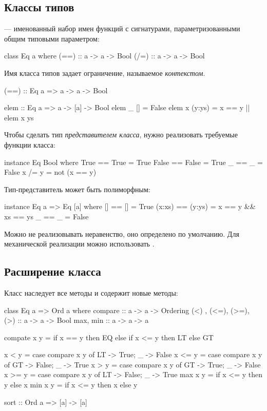 \documentclass[11pt,a4paper]{article}
\begin{document}
\subsection{Классы типов}
 --- именованный набор имен функций с сигнатурами, параметризованными общим типовыми параметром:
\begin{hscode}
class Eq a where
  (==) :: a -> a -> Bool
  (/=) :: a -> a -> Bool
\end{hscode}
Имя класса типов задает ограничение, называемое \textit{контекстом}.
\begin{hscode}
(==) :: Eq a => a -> a -> Bool

elem :: Eq a => a -> [a] -> Bool
elem _ [] = False
elem x (y:ys) = x == y || elem x ys
\end{hscode}
Чтобы сделать тип \textit{представителем класса}, нужно реализовать требуемые функции класса:
\begin{hscode}
instance Eq Bool where
  True  == True  = True
  False == False = True
  _     == _     = False
  x /= y = not (x == y)
\end{hscode}
Тип-представитель может быть полиморфным:
\begin{hscode}
instance Eq a => Eq [a] where
  [] == [] = True
  (x:xs) == (y:ys) = x == y && xs == ys
  _     == _     = False
\end{hscode}
Можно не реализовывать неравенство, оно определено по умолчанию.
Для механической реализации можно использовать .

\subsection{Расширение класса}
Класс  наследует все методы  и содержит новые методы:
\begin{hscode}
class Eq a => Ord a where
  compare :: a -> a -> Ordering
  (<) , (<=), (>=), (>) :: a -> a -> Bool
  max, min :: a -> a -> a

  compate x y = if x == y then EQ 
                else if x <= y then LT
                else GT

  x < y = case compare x y of {LT -> True; _ -> False}
  x <= y = case compare x y of {GT -> False; _ -> True}
  x > y = case compare x y of {GT -> True; _ -> False}
  x >= y = case compare x y of {LT -> False; _ -> True}
  max x y = if x <= y then y else x
  min x y = if x <= y then x else y

sort :: Ord a => [a] -> [a]
\end{hscode}
\end{document}
